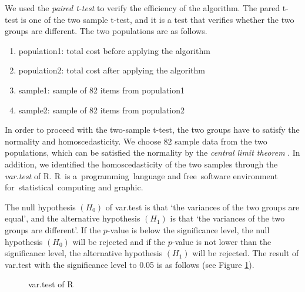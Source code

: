 \documentclass[review]{elsarticle}
\begin{document}
We used the {\it paired t-test}\cite{Rice} to verify the efficiency of the algorithm. The pared t-test is one of the two sample t-test, and it is a test that verifies whether the two groups are different. The two populations are as follows.

\begin{enumerate}[$\bullet$]
	\item population1: total cost before applying the algorithm
	\item population2: total cost after applying the algorithm
	\item sample1: sample of 82 items from population1
	\item sample2: sample of 82 items from population2
\end{enumerate}

In order to proceed with the two-sample t-test, the two groups have to satisfy the normality and homoscedasticity. We choose $82$ sample data from the two populations, which can be satisfied the normality by the {\it central limit theorem} \cite{Durrett}.
In addition, we identified the homoscedasticity of the two samples through the {\it var.test} of R. 
R is a programming language and free software environment for statistical computing and graphic. %



The null hypothesis $(H_{0})$ of var.test is that `the variances of the two groups are equal', and the alternative hypothesis $(H_{1})$ is that `the variances of the two groups are different'. 
If the $p$-value is below the significance level, the null hypothesis $(H_{0})$ will be rejected and if the $p$-value is not lower than the significance level, the alternative hypothesis $(H_{1})$ will be rejected.  The result of var.test with the significance level to 0.05 is as follows (see Figure \ref{fig:vartest}).

\begin{figure}[h!]
	\centering
	\caption{var.test of R}
	\label{fig:vartest}       %
\end{figure}
\end{document}
